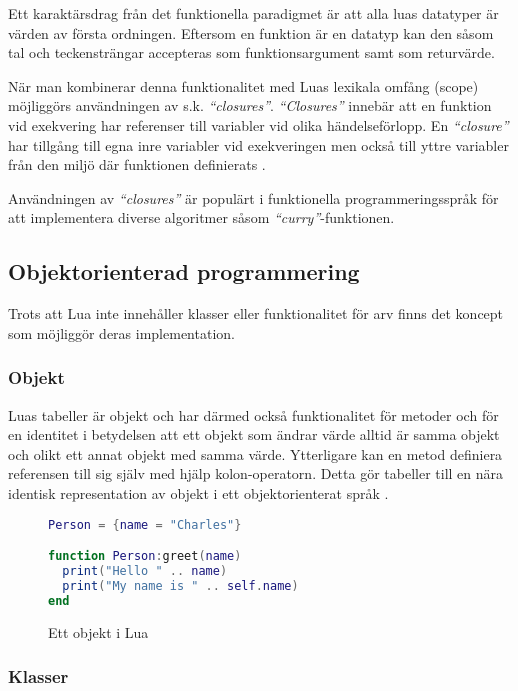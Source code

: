 Ett karaktärsdrag från det funktionella paradigmet är att alla luas datatyper
är värden av första ordningen. Eftersom en funktion är en datatyp kan den såsom
tal och teckensträngar accepteras som funktionsargument samt som returvärde.

När man kombinerar denna funktionalitet med Luas lexikala omfång (scope)
möjliggörs användningen av s.k. \textit{``closures''}. \textit{``Closures''}
innebär att en funktion vid exekvering har referenser till variabler vid olika
händelseförlopp. En \textit{``closure''} har tillgång till egna inre variabler
vid exekveringen men också till yttre variabler från den miljö där funktionen
definierats \citep[s. 45]{ir06}.

Användningen av \textit{``closures''} är populärt i funktionella programmeringsspråk för
att implementera diverse algoritmer såsom \textit{``curry''}-funktionen.

\subsection{Objektorienterad programmering}

Trots att Lua inte innehåller klasser eller funktionalitet för arv finns det
koncept som möjliggör deras implementation.

\subsubsection{Objekt}

Luas tabeller är objekt och har därmed också funktionalitet för metoder och
för en identitet i betydelsen att ett objekt som ändrar värde alltid är samma
objekt och olikt ett annat objekt med samma värde. Ytterligare kan en metod
definiera referensen till sig själv med hjälp kolon-operatorn. Detta gör
tabeller till en nära identisk representation av objekt i ett objektorienterat
språk \citep[s. 149]{ir06}.

\begin{figure}[ht]
  \begin{lstlisting}[language=Lua]
Person = {name = "Charles"}

function Person:greet(name)
  print("Hello " .. name)
  print("My name is " .. self.name)
end
  \end{lstlisting}
  \caption{Ett objekt i Lua}
\end{figure}

\subsubsection{Klasser}

